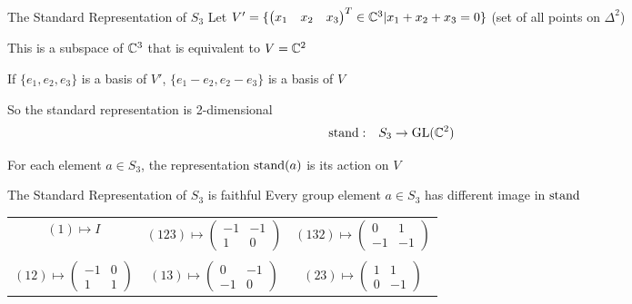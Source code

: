 \begin{frame}{The Standard Representation of $S_3$}
    \large
    Let $V' = \{\begin{pmatrix}
        x_1 & x_2 & x_3
    \end{pmatrix}^T \in \mathbb{C}^3 | x_1 + x_2 + x_3 = 0\}$
    (set of all points on $\Delta^2$)
    
    \pause
    This is a subspace of $\mathbb{C}^3$ that is equivalent to $V = \mathbb{C}^2$

    \pause
    If $\{e_1, e_2, e_3\}$ is a basis of $V'$,
    $\{e_1 - e_2, e_2 - e_3\}$ is a basis of $V$
    
    \vspace{1em}
    \pause
    So the standard representation is 2-dimensional
    \begin{align*}
        \operatorname{stand}: \quad & S_3 \to \operatorname{GL}(\mathbb{C}^2)
    \end{align*}
    
    \pause
    For each element $a \in S_3$, the representation $\operatorname{stand}(a)$ is its action on $V$
\end{frame}

\begin{frame}{The Standard Representation of $S_3$ is faithful}
    \large
    Every group element $a \in S_3$ has different image in $\operatorname{stand}$

    \pause
    \vspace{1em}
    \centering
    \begin{tabular}{c c c}
        $(1) \mapsto I$ & \pause $(123) \mapsto \begin{pmatrix}
            -1 & -1 \\
            1 & 0
        \end{pmatrix}$ & \pause $(132) \mapsto \begin{pmatrix}
            0 & 1 \\
            -1 & -1
        \end{pmatrix}$ \\\\ \pause $(12) \mapsto \begin{pmatrix}
            -1 & 0 \\
            1 & 1
        \end{pmatrix}$ & \pause $(13) \mapsto \begin{pmatrix}
            0 & -1 \\
            -1 & 0
        \end{pmatrix}$ & \pause $(23) \mapsto \begin{pmatrix}
            1 & 1 \\
            0 & -1
        \end{pmatrix}$
    \end{tabular}
\end{frame}

